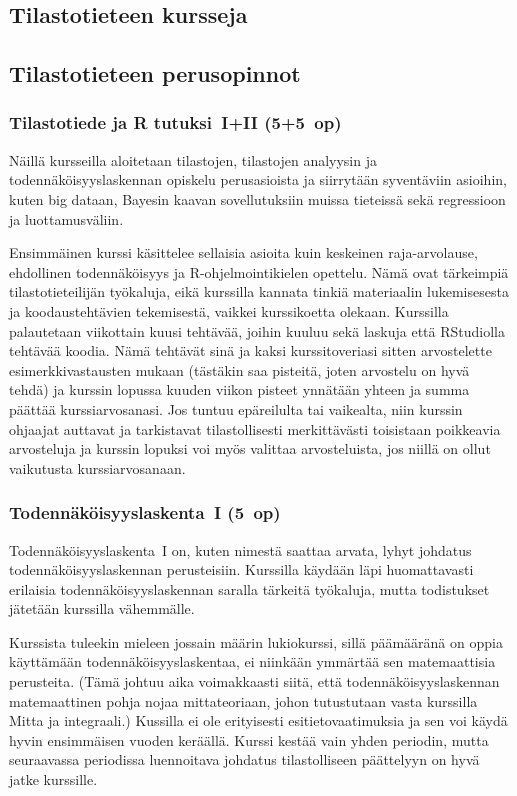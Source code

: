 \documentclass[../ala_hataile.tex]{subfiles}
\begin{document}
\subsection*{Tilastotieteen kursseja}
\subsection*{Tilastotieteen perusopinnot}
\subsubsection*{Tilastotiede ja R tutuksi~I+II (5+5~op)}
Näillä kursseilla aloitetaan tilastojen,
tilastojen analyysin ja
todennäköisyyslaskennan opiskelu
perusasioista ja siirrytään 
syventäviin asioihin, kuten big dataan, Bayesin
kaavan sovellutuksiin muissa tieteissä sekä
regressioon ja luottamusväliin.

Ensimmäinen kurssi käsittelee sellaisia
asioita kuin keskeinen raja-arvolause, 
ehdollinen todennäköisyys ja
R-ohjelmointikielen opettelu. Nämä ovat tärkeimpiä
tilastotieteilijän työkaluja, eikä kurssilla
kannata tinkiä materiaalin lukemisesesta ja
koodaustehtävien tekemisestä, vaikkei
kurssikoetta olekaan. Kurssilla palautetaan
viikottain kuusi tehtävää, joihin kuuluu sekä laskuja
että RStudiolla tehtävää koodia. Nämä tehtävät
sinä ja kaksi kurssitoveriasi sitten arvostelette
esimerkkivastausten mukaan (tästäkin saa
pisteitä, joten arvostelu on hyvä tehdä) ja 
kurssin lopussa kuuden viikon
pisteet ynnätään yhteen ja summa päättää
kurssiarvosanasi. Jos tuntuu epäreilulta tai
vaikealta, niin kurssin ohjaajat auttavat ja
tarkistavat tilastollisesti merkittävästi
toisistaan poikkeavia arvosteluja ja kurssin lopuksi
voi myös valittaa arvosteluista, jos niillä on ollut
vaikutusta kurssiarvosanaan.

\subsubsection*{Todennäköisyyslaskenta~I (5~op)}
Todennäköisyyslaskenta~I on,
kuten nimestä saattaa arvata, lyhyt johdatus
todennäköisyyslaskennan perusteisiin.
Kurssilla käydään läpi huomattavasti erilaisia
todennäköisyyslaskennan saralla tärkeitä
työkaluja, mutta todistukset jätetään
kurssilla vähemmälle.

Kurssista tuleekin mieleen jossain määrin
lukiokurssi, sillä pää\-määränä on oppia
käyttämään toden\-näköisyys\-laskentaa, ei
niinkään ymmärtää sen matemaattisia perusteita.
(Tämä johtuu aika voimakkaasti
siitä, että toden\-näköisyys\-laskennan matemaattinen
pohja nojaa mitta\-teoriaan, johon
tutustutaan vasta kurssilla Mitta ja integraali.)
Kussilla ei ole erityisesti esi\-tieto\-vaatimuksia
ja sen voi käydä hyvin ensimmäisen
vuoden keräällä. Kurssi kestää vain yhden
periodin, mutta seuraavassa periodissa
luennoitava johdatus tilastolliseen päättelyyn
on hyvä jatke kurssille.
\end{document}
